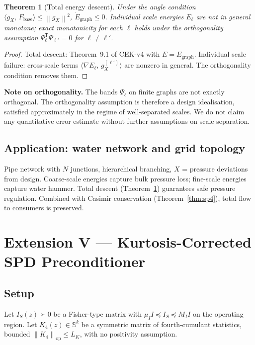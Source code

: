 \documentclass[11pt,a4paper]{article}
\newtheorem{theorem}{Theorem}[section]
\theoremstyle{definition}
\newcommand{\Fbase}{F_{\mathrm{base}}}
\newcommand{\T}{^{\mathsf{T}}}
\newcommand{\norm}[1]{\left\|#1\right\|}
\newcommand{\inner}[2]{\langle #1,\,#2\rangle}
\newcommand{\graph}{\mathrm{graph}}
\begin{document}
\begin{theorem}[Total energy descent]
\label{thm:dfl3}
Under the angle condition $\inner{g_X}{\Fbase} \leq \norm{g_X}^2$, $\dot E_\graph \leq 0$. Individual scale energies $E_\ell$ are not in general monotone; exact monotonicity for each $\ell$ holds under the orthogonality assumption $\Psi_\ell\T \Psi_{\ell'} = 0$ for $\ell \neq \ell'$.
\end{theorem}

\begin{proof}
Total descent: Theorem~9.1 of CEK-v4 with $E = E_\graph$. Individual scale failure: cross-scale terms $\inner{\nabla E_\ell}{g_X^{(\ell')}}$ are nonzero in general. The orthogonality condition removes them.
\end{proof}

\textbf{Note on orthogonality.} The bands $\Psi_\ell$ on finite graphs are not exactly orthogonal. The orthogonality assumption is therefore a design idealisation, satisfied approximately in the regime of well-separated scales. We do not claim any quantitative error estimate without further assumptions on scale separation.

\subsection{Application: water network and grid topology}

Pipe network with $N$ junctions, hierarchical branching, $X$ = pressure deviations from design. Coarse-scale energies capture bulk pressure loss; fine-scale energies capture water hammer. Total descent (Theorem~\ref{thm:dfl3}) guarantees safe pressure regulation. Combined with Casimir conservation (Theorem~\ref{thm:sp4}), total flow to consumers is preserved.

\newpage

\section{Extension V --- Kurtosis-Corrected SPD Preconditioner}

\subsection{Setup}

Let $I_S(z) \succ 0$ be a Fisher-type matrix with $\mu_I I \preceq I_S \preceq M_I I$ on the operating region. Let $K_4(z) \in \mathbb{S}^k$ be a symmetric matrix of fourth-cumulant statistics, bounded $\norm{K_4}_{\mathrm{op}} \leq L_K$, with no positivity assumption.
\end{document}
